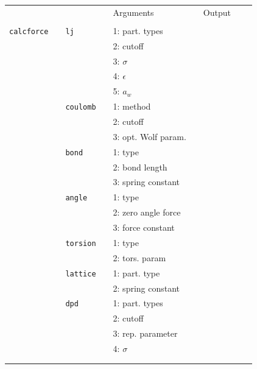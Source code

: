 \documentclass[11pt]{article}
\begin{document}
\begin{center}
  
  \begin{tabular}{cclclclll}
    {\color{red}{\textbf{Action}}} && {\color{blue}{Specifier}} && Arguments && Output \\
                                   && && && \\
    \hline
    \verb!calcforce! && \verb!lj! && 1: part. types && \\
                                   && && 2: cutoff&& \\
                                   && && 3: $\sigma$ && \\
                                   && && 4: $\epsilon$ && \\
                                   && && 5: $a_w$ && \\
                   &&\verb!coulomb!&& 1: method && \\
                                   && && 2: cutoff && \\
                                   && && 3: opt. Wolf param.\\
                    && \verb!bond! && 1: type && \\  
                    &&             && 2: bond length && \\
                    &&             && 3: spring constant && \\
                    && \verb!angle!&& 1: type && \\  
                    &&             && 2: zero angle force && \\
                    &&             && 3: force constant && \\            
                    && \verb!torsion! && 1: type && \\  
                    &&             && 2: tors. param && \\
                    && \verb!lattice! && 1: part. type && \\
                    &&               && 2: spring constant && \\   
                    && \verb!dpd! && 1: part. types && \\
                    &&            && 2: cutoff && \\  
                    &&            && 3: rep. parameter && \\ 
                    &&            && 4: $\sigma$ && \\
                                   && && && \\
    \hline
    && && && 
  \end{tabular}

\end{center}
\end{document}
